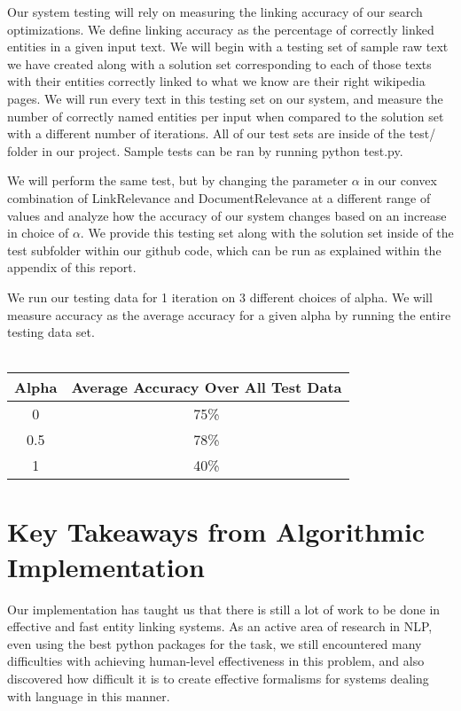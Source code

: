 \documentclass[twoside,11pt]{article}
\begin{document}
Our system testing will rely on measuring the linking accuracy of our search optimizations. We define linking accuracy as the percentage of correctly linked entities in a given input text. We will begin with a testing set of sample raw text we have created along with a solution set corresponding to each of those texts with their entities correctly linked to what we know are their right wikipedia pages. We will run every text in this testing set on our system, and measure the number of correctly named entities per input when compared to the solution set with a different number of iterations. All of our test sets are inside of the test/ folder in our project. Sample tests can be ran by running python test.py. 

We will perform the same test, but by changing the parameter $\alpha$ in our convex combination of LinkRelevance and DocumentRelevance at a different range of values and analyze how the accuracy of our system changes based on an increase in choice of $\alpha$. We provide this testing set along with the solution set inside of the test subfolder within our github code, which can be run as explained within the appendix of this report.

We run our testing data for 1 iteration on 3 different choices of alpha. We will measure accuracy as the average accuracy for a given alpha by running the entire testing data set.
\\ \\
\begin{tabular}{cc}
\hline
\textbf{Alpha}            & \textbf{Average Accuracy Over All Test Data} \\ \hline
\multicolumn{1}{|c|}{0}   & \multicolumn{1}{c|}{75\%}                    \\ \hline
\multicolumn{1}{|c|}{0.5} & \multicolumn{1}{c|}{78\%}                    \\ \hline
\multicolumn{1}{|c|}{1}   & \multicolumn{1}{c|}{40\%}                    \\ \hline
\end{tabular}

\section{Key Takeaways from Algorithmic Implementation}

Our implementation has taught us that there is still a lot of work to be done in effective and fast entity linking systems. As an active area of research in NLP, even using the best python packages for the task, we still encountered many difficulties with achieving human-level effectiveness in this problem, and also discovered how difficult it is to create effective formalisms for systems dealing with language in this manner.
\end{document}
